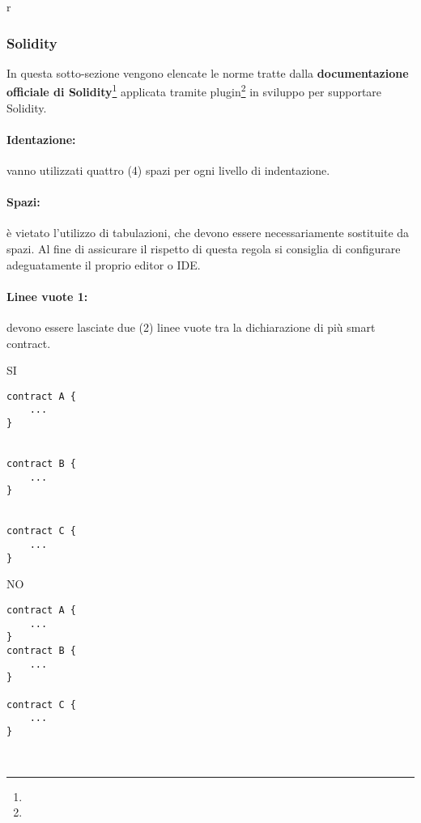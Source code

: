r\documentclass[../ProcessiPrimari.tex]{subfiles}
\begin{document}
	
\subsubsection{Solidity}
In questa sotto-sezione vengono elencate le norme tratte dalla \textbf{documentazione officiale di Solidity}\footnote{} applicata tramite plugin\footnote{} in sviluppo per supportare Solidity.
\paragraph*{Identazione: }
vanno utilizzati quattro (4) spazi per ogni livello di indentazione.
\paragraph*{Spazi: }
è vietato l'utilizzo di tabulazioni, che devono essere necessariamente sostituite da spazi. Al fine di assicurare il rispetto di questa regola si consiglia di configurare adeguatamente il proprio editor o IDE.
\paragraph*{Linee vuote 1: }
devono essere lasciate due (2) linee vuote tra la dichiarazione di più smart contract.
\begin{center}{
\begin{minipage}{6cm}
{\begin{center}SI\end{center}}
\begin{Verbatim}[frame=single]
contract A {
    ...
}


contract B {
    ...
}


contract C {
    ...
}
\end{Verbatim}
\end{minipage}
\hfil
\begin{minipage}{6cm}
{\begin{center}NO\end{center}}
\begin{Verbatim}[frame=single]
contract A {
    ...
}
contract B {
    ...
}

contract C {
    ...
}



\end{Verbatim}
\end{minipage}
}
\end{center}
\end{document}
